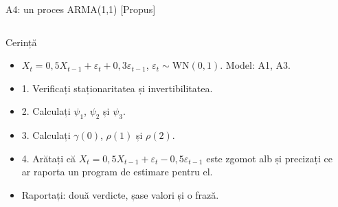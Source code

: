 \begin{frame}{A4: un proces ARMA(1,1) [Propus]}
\propsub
\itemsize{\scriptsize}
\begin{columns}[T]
\begin{column}{\taskw}
\begin{block}{Cerință}
\begin{itemize}
    \item $X_t = 0{,}5X_{t-1} + \varepsilon_t + 0{,}3\varepsilon_{t-1}$, $\varepsilon_t \sim \mathrm{WN}(0, 1)$. Model: A1, A3.
    \item 1. Verificați staționaritatea și invertibilitatea.
    \item 2. Calculați $\psi_1$, $\psi_2$ și $\psi_3$.
    \item 3. Calculați $\gamma(0)$, $\rho(1)$ și $\rho(2)$.
    \item 4. Arătați că $X_t = 0{,}5X_{t-1} + \varepsilon_t - 0{,}5\varepsilon_{t-1}$ este zgomot alb și precizați ce ar raporta un program de estimare pentru el.
    \item Raportați: două verdicte, șase valori și o frază.
\end{itemize}
\end{block}
\end{column}
\begin{column}{\solw}
\end{column}
\end{columns}
\end{frame}

